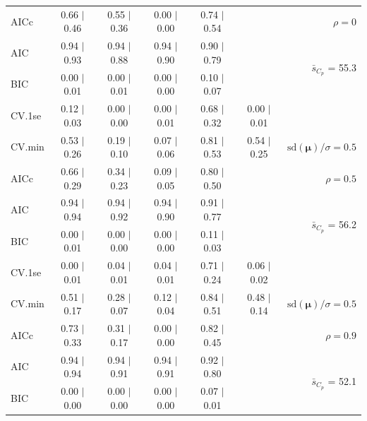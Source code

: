 \documentclass[12pt]{article}
\newcommand{\mr}[1]{\mathrm{#1}}
\newcommand{\bm}[1]{\mathbf{#1}}
\begin{document}
\begin{table}[p]
\begin{center}
\begin{tabular}{l*{5}{c}|r}
AICc & 0.66 $\mid$ 0.46 & 0.55 $\mid$ 0.36 & 0.00 $\mid$ 0.00 & 0.74 $\mid$ 0.54 & & $\rho=0$ \\
AIC & 0.94 $\mid$ 0.93 & 0.94 $\mid$ 0.88 & 0.94 $\mid$ 0.90 & 0.90 $\mid$ 0.79 & & \multirow{2}{*}{$\bar{s}_{C_p}$ = 55.3} \\
BIC & 0.00 $\mid$ 0.01 & 0.00 $\mid$ 0.01 & 0.00 $\mid$ 0.00 & 0.10 $\mid$ 0.07 & & \\
 \hline 
CV.1se & 0.12 $\mid$ 0.03 & 0.00 $\mid$ 0.00 & 0.00 $\mid$ 0.01 & 0.68 $\mid$ 0.32 & 0.00 $\mid$ 0.01 &\\
CV.min & 0.53 $\mid$ 0.26 & 0.19 $\mid$ 0.10 & 0.07 $\mid$ 0.06 & 0.81 $\mid$ 0.53 & 0.54 $\mid$ 0.25 &  $\mr{sd}(\bm{\mu})/\sigma=0.5$ \\
AICc & 0.66 $\mid$ 0.29 & 0.34 $\mid$ 0.23 & 0.09 $\mid$ 0.05 & 0.80 $\mid$ 0.50 & & $\rho=0.5$ \\
AIC & 0.94 $\mid$ 0.94 & 0.94 $\mid$ 0.92 & 0.94 $\mid$ 0.90 & 0.91 $\mid$ 0.77 & & \multirow{2}{*}{$\bar{s}_{C_p}$ = 56.2} \\
BIC & 0.00 $\mid$ 0.01 & 0.00 $\mid$ 0.00 & 0.00 $\mid$ 0.00 & 0.11 $\mid$ 0.03 & & \\
 \hline 
CV.1se & 0.00 $\mid$ 0.01 & 0.04 $\mid$ 0.01 & 0.04 $\mid$ 0.01 & 0.71 $\mid$ 0.24 & 0.06 $\mid$ 0.02 &\\
CV.min & 0.51 $\mid$ 0.17 & 0.28 $\mid$ 0.07 & 0.12 $\mid$ 0.04 & 0.84 $\mid$ 0.51 & 0.48 $\mid$ 0.14 &  $\mr{sd}(\bm{\mu})/\sigma=0.5$ \\
AICc & 0.73 $\mid$ 0.33 & 0.31 $\mid$ 0.17 & 0.00 $\mid$ 0.00 & 0.82 $\mid$ 0.45 & & $\rho=0.9$ \\
AIC & 0.94 $\mid$ 0.94 & 0.94 $\mid$ 0.91 & 0.94 $\mid$ 0.91 & 0.92 $\mid$ 0.80 & & \multirow{2}{*}{$\bar{s}_{C_p}$ = 52.1} \\
BIC & 0.00 $\mid$ 0.00 & 0.00 $\mid$ 0.00 & 0.00 $\mid$ 0.00 & 0.07 $\mid$ 0.01 & & \\
 \hline 
 \end{tabular}
\end{center}
\vspace{-1cm}
\end{table}
\end{document}

